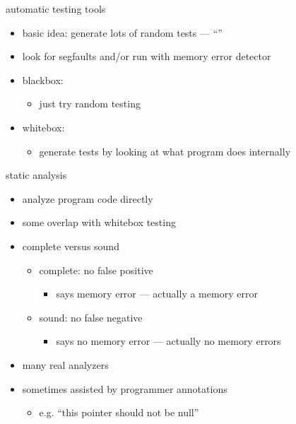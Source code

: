 \begin{frame}{automatic testing tools}
    \begin{itemize}
        \item basic idea: generate lots of random tests --- ``''
        \item look for segfaults and/or run with memory error detector
        \vspace{.5cm}
        \item blackbox:
            \begin{itemize}
            \item just try random testing
            \end{itemize}
        \item whitebox:
            \begin{itemize}
            \item generate tests by looking at what program does internally
            \end{itemize}
    \end{itemize}
\end{frame}


\begin{frame}{static analysis}
    \begin{itemize}
        \item analyze program code directly
        \item some overlap with whitebox testing
        \item complete versus sound
            \begin{itemize}
                \item complete: no false positive
                    \begin{itemize}
                        \item says memory error --- actually a memory error
                    \end{itemize}
                \item sound: no false negative
                    \begin{itemize}
                        \item says no memory error --- actually no memory errors
                    \end{itemize}
            \end{itemize}
        \item many real analyzers 
        \item sometimes assisted by programmer annotations
            \begin{itemize}
                \item e.g. ``this pointer should not be null''
            \end{itemize}
    \end{itemize}
\end{frame}

